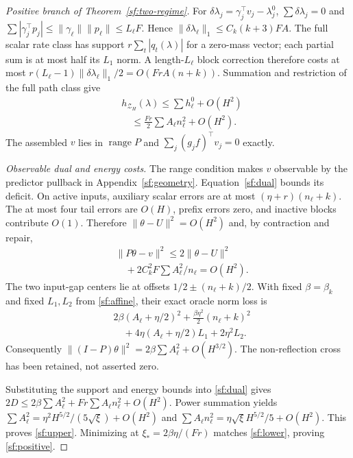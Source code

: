 \documentclass[journal]{IEEEtran}
\begin{document}
\begin{proof}[Positive branch of Theorem~\ref{sf:two-regime}]
For $\delta\lambda_j=\gamma_j^\top v_j-\lambda_j^0$,
$\sum\delta\lambda_j=0$ and
$\sum|\gamma_j^\top p_j|\le\|\gamma_\ell\|\|p_\ell\|\le L_\ell F$.
Hence $\|\delta\lambda_\ell\|_1\le C_k(k+3)FA$.
The full scalar rate class has support $r\sum_t|q_t(\lambda)|$ for a zero-mass vector;
each partial sum is at most half its $L_1$ norm.
A length-$L_\ell$ block correction therefore costs
at most $r(L_\ell-1)\|\delta\lambda_\ell\|_1/2=O(FrA(n+k))$.
Summation and restriction of the full path class give
\begin{equation}\label{sf:positive-support}
\begin{aligned}
&h_{\mathcal Z_H}(\lambda)\le\sum h_\ell^0+O(H^2)\\
&\quad\le\frac{Fr}{2}\sum A_\ell n_\ell^2+O(H^2).
\end{aligned}
\end{equation}
The assembled $v$ lies in $\operatorname{range}P$ and
$\sum_j(g_jf)^\top v_j=0$ exactly.

\par\smallskip\noindent\textit{Observable dual and energy costs.}\enspace 
The range condition makes $v$ observable by the predictor pullback in
Appendix~\ref{sf:geometry}. Equation~\eqref{sf:dual} bounds its deficit.
On active inputs, auxiliary scalar errors are at most $(\eta+r)(n_\ell+k)$.
The at most four tail errors are $O(H)$, prefix errors zero, and inactive
blocks contribute $O(1)$.
Therefore $\|\theta-U\|^2=O(H^2)$ and, by contraction and repair,
\[
\begin{aligned}
&\|P\theta-v\|^2\le2\|\theta-U\|^2\\
&\quad+2C_k^2F\sum A_\ell^2/n_\ell=O(H^2).
\end{aligned}
\]
The two input-gap centers lie at offsets $1/2\pm(n_\ell+k)/2$.
With fixed $\beta=\beta_k$ and fixed $L_1,L_2$ from \eqref{sf:affine},
their exact oracle norm loss is
\[
\begin{aligned}
&2\beta(A_\ell+\eta/2)^2+\frac{\beta\eta^2}{2}(n_\ell+k)^2\\
&\quad+4\eta(A_\ell+\eta/2)L_1+2\eta^2L_2 .
\end{aligned}
\]
Consequently $\|(I-P)\theta\|^2=2\beta\sum A_\ell^2+O(H^{3/2})$.
The non-reflection cross has been retained, not asserted zero.

Substituting the support and energy bounds into \eqref{sf:dual} gives
$2D\le2\beta\sum A_\ell^2+Fr\sum A_\ell n_\ell^2+O(H^2)$.
Power summation yields
$\sum A_\ell^2=\eta^2H^{5/2}/(5\sqrt\xi)+O(H^2)$ and
$\sum A_\ell n_\ell^2=\eta\sqrt\xi H^{5/2}/5+O(H^2)$.
This proves \eqref{sf:upper}. Minimizing at
$\xi_*=2\beta\eta/(Fr)$ matches \eqref{sf:lower}, proving \eqref{sf:positive}.
\end{proof}
\end{document}
